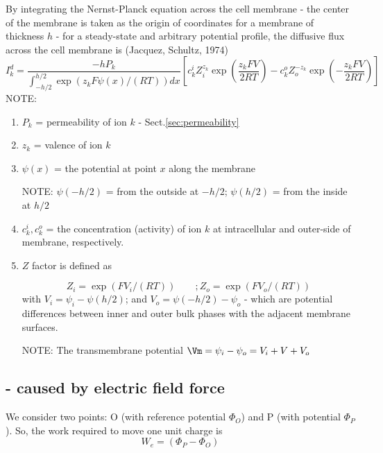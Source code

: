 By integrating the Nernst-Planck equation across the cell membrane -
the center of the membrane is taken as the origin of coordinates for a membrane
of thickness $h$ - for a steady-state and arbitrary potential profile, the
diffusive flux across the cell membrane is (Jacquez, Schultz, 1974)
\begin{equation}
I_k^d = \frac{-h P_k}{\int_{-h/2}^{h/2}  \exp\left( z_k F \psi(x) /(RT)
\right)dx} 
\left[  c_k^i Z^{z_k}_i \exp\left(\frac{z_k F V}{2 RT} \right) 
      - c_k^o Z^{-z_k}_o \exp\left( -\frac{z_k F V}{2 RT} \right)
\right]
\end{equation}
NOTE:
\begin{enumerate}
  \item $P_k$ = permeability of ion $k$ - Sect.\ref{sec:permeability}
  
  \item $z_k$ = valence of ion $k$
  
  \item $\psi(x)$ = the potential at point $x$ along the membrane
  
  NOTE: $\psi(-h/2)$ = from the outside at $-h/2$;
  $\psi(h/2)$ = from the inside at $h/2$
  
  \item $c_k^i, c_k^o$ = the concentration (activity) of ion $k$ at
  intracellular and outer-side of membrane, respectively.
  
  \item $Z$ factor is defined as 
  
\begin{equation}
Z_i = \exp (F V_i /(RT)) \qquad;
Z_o = \exp (F V_o / (RT)) 
\end{equation}
with $V_i = \psi_i - \psi(h/2)$; and $V_o = \psi(-h/2) - \psi_o$ - which are
potential differences between inner and outer bulk phases with the adjacent
membrane surfaces.

NOTE: The transmembrane potential $\Vm = \psi_i - \psi_o = V_i + V + V_o$


\end{enumerate}



\subsection{- caused by electric field force}
\label{sec:flow-by-electric-field-force}
\label{sec:electric-field}

We consider two points: O (with reference potential $\Phi_O$) and P (with
potential $\Phi_P$).  So, the work required to move one unit charge 
is
\begin{equation}
\label{eq:work-move-1-molecule-ion}
W_e = (\Phi_P - \Phi_O)
\end{equation}

